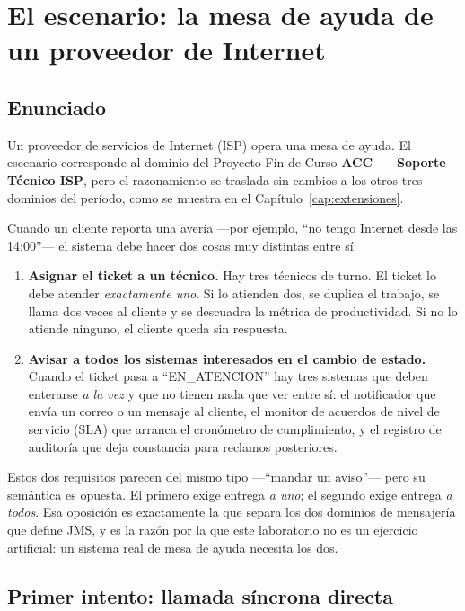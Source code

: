 \documentclass[11pt,a4paper]{book}
\begin{document}
\chapter{El escenario: la mesa de ayuda de un proveedor de Internet}
\label{cap:problema}

\section{Enunciado}

Un proveedor de servicios de Internet (ISP) opera una mesa de ayuda.
El escenario corresponde al dominio del Proyecto Fin de Curso \textbf{ACC --- Soporte Técnico ISP}, pero el razonamiento se traslada sin cambios a los otros tres dominios del período, como se muestra en el Capítulo~\ref{cap:extensiones}.

Cuando un cliente reporta una avería ---por ejemplo, ``no tengo Internet desde las 14:00''--- el sistema debe hacer dos cosas muy distintas entre sí:

\begin{enumerate}[leftmargin=1.8em,itemsep=4pt,topsep=4pt]
	\item \textbf{Asignar el ticket a un técnico.} Hay tres técnicos de turno. El ticket lo debe atender \emph{exactamente uno}. Si lo atienden dos, se duplica el trabajo, se llama dos veces al cliente y se descuadra la métrica de productividad. Si no lo atiende ninguno, el cliente queda sin respuesta.
	\item \textbf{Avisar a todos los sistemas interesados en el cambio de estado.} Cuando el ticket pasa a ``EN\_ATENCION'' hay tres sistemas que deben enterarse \emph{a la vez} y que no tienen nada que ver entre sí: el notificador que envía un correo o un mensaje al cliente, el monitor de acuerdos de nivel de servicio (SLA) que arranca el cronómetro de cumplimiento, y el registro de auditoría que deja constancia para reclamos posteriores.
\end{enumerate}

Estos dos requisitos parecen del mismo tipo ---``mandar un aviso''--- pero su semántica es opuesta.
El primero exige entrega \emph{a uno}; el segundo exige entrega \emph{a todos}.
Esa oposición es exactamente la que separa los dos dominios de mensajería que define JMS, y es la razón por la que este laboratorio no es un ejercicio artificial: un sistema real de mesa de ayuda necesita los dos.

\section{Primer intento: llamada síncrona directa}
\end{document}
